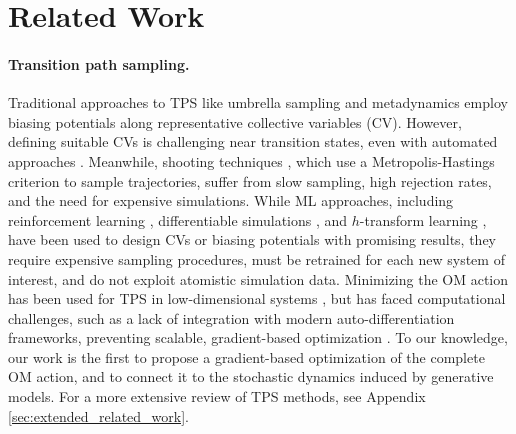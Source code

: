 \vspace{-5pt}
\section{Related Work}
\vspace{-3pt}
\paragraph{Transition path sampling.}
Traditional approaches to TPS like umbrella sampling \cite{torrie1977nonphysical} and metadynamics \cite{Laio2002a} employ biasing potentials along representative collective variables (CV). However, defining suitable CVs is challenging near transition states, even with automated approaches \cite{Sultan2018AutomatedLearning, Sipka2023}. Meanwhile, shooting techniques \cite{mullen2015easy, borrero2016avoiding, jung2017transition, bolhuis2021transition}, which use a Metropolis-Hastings criterion to sample trajectories, suffer from slow sampling, high rejection rates, and the need for expensive simulations. While ML approaches, including reinforcement learning \cite{das2021reinforcement, rose2021reinforcement, singh2023variational, seong2024transitionpathsamplingimproved, liang2023probing}, differentiable simulations \cite{sipka2023differentiable}, and $h$-transform learning \cite{singh2023variational, du2024doob}, have been used to design CVs or biasing potentials with promising results, they require expensive sampling procedures, must be retrained for each new system of interest, and do not exploit atomistic simulation data. Minimizing the OM action has been used for TPS in low-dimensional systems \cite{faccioli2006dominant, vanden2008geometric, autieri2009dominant, 10.1063/1.3372802, Lee2017}, but has faced computational challenges, such as a lack of integration with modern auto-differentiation frameworks, preventing scalable, gradient-based optimization \cite{a2012dominant}. To our knowledge, our work is the first to propose a gradient-based optimization of the complete OM action, and to connect it to the stochastic dynamics induced by generative models. For a more extensive review of TPS methods, see Appendix \ref{sec:extended_related_work}.

\vspace{-7pt}
